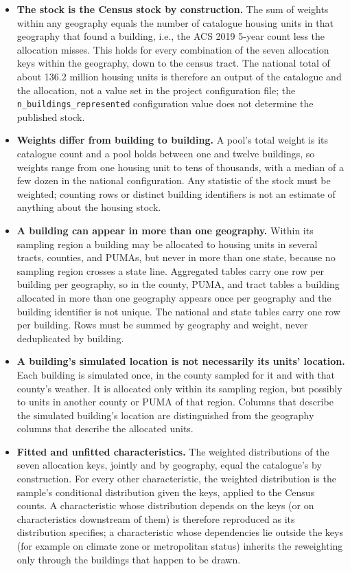 \begin{itemize}
    \item \textbf{The stock is the Census stock by construction.} The sum of weights within any geography equals the number of catalogue housing units in that geography that found a building, i.e., the ACS 2019 5-year count less the allocation misses. This holds for every combination of the seven allocation keys within the geography, down to the census tract. The national total of about 136.2 million housing units is therefore an output of the catalogue and the allocation, not a value set in the project configuration file; the \texttt{n\_buildings\_represented} configuration value does not determine the published stock.
    \item \textbf{Weights differ from building to building.} A pool's total weight is its catalogue count and a pool holds between one and twelve buildings, so weights range from one housing unit to tens of thousands, with a median of a few dozen in the national configuration. Any statistic of the stock must be weighted; counting rows or distinct building identifiers is not an estimate of anything about the housing stock.
    \item \textbf{A building can appear in more than one geography.} Within its sampling region a building may be allocated to housing units in several tracts, counties, and PUMAs, but never in more than one state, because no sampling region crosses a state line. Aggregated tables carry one row per building per geography, so in the county, PUMA, and tract tables a building allocated in more than one geography appears once per geography and the building identifier is not unique. The national and state tables carry one row per building. Rows must be summed by geography and weight, never deduplicated by building.
    \item \textbf{A building's simulated location is not necessarily its units' location.} Each building is simulated once, in the county sampled for it and with that county's weather. It is allocated only within its sampling region, but possibly to units in another county or PUMA of that region. Columns that describe the simulated building's location are distinguished from the geography columns that describe the allocated units.
    \item \textbf{Fitted and unfitted characteristics.} The weighted distributions of the seven allocation keys, jointly and by geography, equal the catalogue's by construction. For every other characteristic, the weighted distribution is the sample's conditional distribution given the keys, applied to the Census counts. A characteristic whose distribution depends on the keys (or on characteristics downstream of them) is therefore reproduced as its distribution specifies; a characteristic whose dependencies lie outside the keys (for example on climate zone or metropolitan status) inherits the reweighting only through the buildings that happen to be drawn.

\end{itemize}
